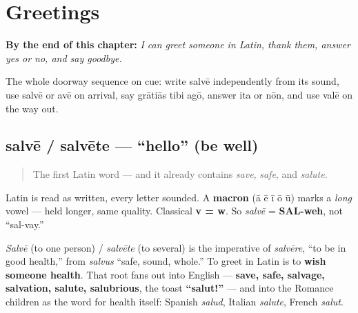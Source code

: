 
\chapter{Greetings}
\label{ch:greetings}

\begin{chapteropening}
\textbf{By the end of this chapter:} \emph{I can greet someone in Latin, thank them, answer yes or no, and say goodbye.}

The whole doorway sequence on cue: write salvē independently from its sound, use salvē or avē on arrival, say grātiās tibi agō, answer ita or nōn, and use valē on the way out.
\end{chapteropening}

\section[salvē / salvēte]{salvē / salvēte — \textquotedblleft{}hello\textquotedblright{} (be well)}

\label{lesson:LA-C01-salve}



\begin{quote}
The first Latin word — and it already contains \emph{save}, \emph{safe}, and \emph{salute}.
\end{quote}

\begin{sounds}
Latin is read as written, every letter sounded. A \textbf{macron} (ā ē ī ō ū) marks a \emph{long} vowel — held longer, same quality. Classical \textbf{v = w}. So \emph{salvē} = \textbf{SAL-weh}, not \textquotedblleft{}sal-vay.\textquotedblright{}
\end{sounds}

\begin{cousinweb}
\emph{Salvē} (to one person) / \emph{salvēte} (to several) is the imperative of \emph{salvēre}, \textquotedblleft{}to be in good health,\textquotedblright{} from \emph{salvus} \textquotedblleft{}safe, sound, whole.\textquotedblright{} To greet in Latin is to \textbf{wish someone health}. That root fans out into English — \textbf{save, safe, salvage, salvation, salute, salubrious}, the toast \textbf{\textquotedblleft{}salut!\textquotedblright{}} — and into the Romance children as the word for health itself: Spanish \emph{salud}, Italian \emph{salute}, French \emph{salut}.
\end{cousinweb}

